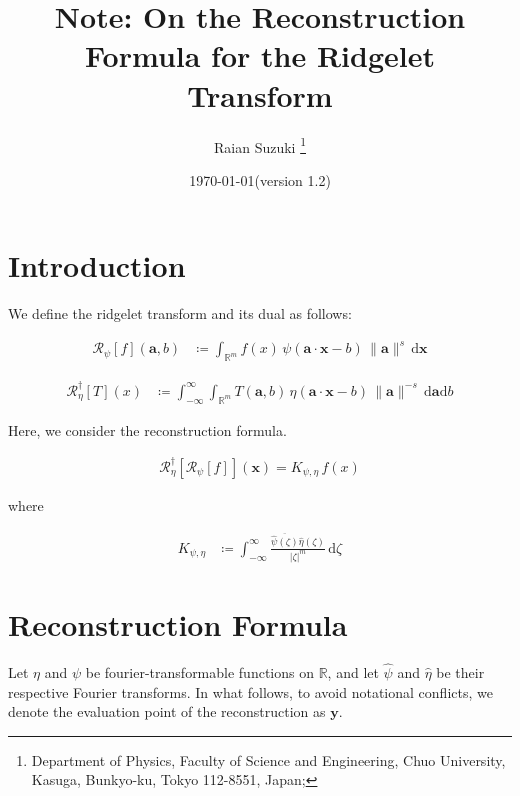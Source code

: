 \documentclass[a4paper,12pt]{article}
\newcommand{\intinf}{\int_{-\infty}^{\infty}}
\newcommand{\intrm}{\int_{\mathbb{R}^m}}
\newcommand{\R}{\mathbb{R}}
\newcommand{\Rid}{\mathscr{R}}
\newcommand{\Ridd}{\mathscr{R}^{\dagger}}
\newcommand{\z}{\zeta}
\newcommand{\va}{\bm{a}}
\newcommand{\vx}{\bm{x}}
\newcommand{\vy}{\bm{y}}
\newcommand{\nora}{\|\bm{a}\|}
\newcommand{\absz}{|\z|}
\newcommand{\da}{\mathrm{d}\va}
\newcommand{\dx}{\mathrm{d}\vx}
\newcommand{\db}{\mathrm{d}b}
\newcommand{\dd}{\mathrm{d}}
\newcommand{\psihat}{\widehat{\psi}}
\newcommand{\etahat}{\widehat{\eta}}
\begin{document}
\title{
\bf 
Note: On the Reconstruction Formula for the Ridgelet Transform
}
\author{
Raian Suzuki
\footnote{
Department of Physics,
Faculty of Science and Engineering,
Chuo University, 
Kasuga, Bunkyo-ku, Tokyo 112-8551, Japan;
} 
}

\date{\today (version 1.2)}

\pagestyle{plain}
\maketitle

  

\clearpage

\section{Introduction}

We define the ridgelet transform and its dual as follows:

\begin{align}
  \Rid_\psi[f](\va, b) &\coloneqq \intrm f(x) \, \psi(\va \cdot \vx - b) \, \nora^s \, \dx
\end{align}

\begin{align}
  \Ridd_{\eta}[T](x) &\coloneqq \intinf \intrm  T(\va, b) \, \eta(\va \cdot \vx - b) \, \nora^{-s}\, \da \db
\end{align}

Here, we consider the reconstruction formula.

\begin{align}
  \Ridd_{\eta}[\Rid_\psi[f]](\vx) = K_{\psi, \eta} \, f(x)
\end{align}

where 

\begin{align}
  K_{\psi, \eta} &\coloneqq \intinf \frac{\overline{\psihat(\z)}\etahat(\z)}{\absz^{m}} \, \dd \z
\end{align}

\clearpage

\section{Reconstruction Formula}

Let $\eta$ and $\psi$ be fourier-transformable functions on $\R$, and let $\psihat$ and $\etahat$ be their respective Fourier transforms.
In what follows, to avoid notational conflicts, we denote the evaluation point of the reconstruction as $\vy$.
\end{document}

